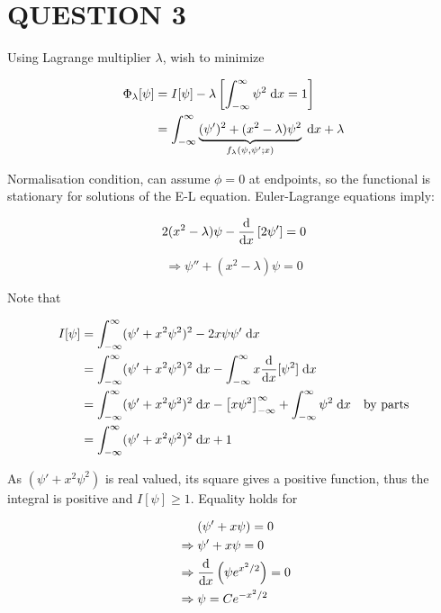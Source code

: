 \documentclass[a4paper]{article}
\begin{document}
\section{QUESTION 3}

Using Lagrange multiplier $ \lambda $, wish to minimize


\begin{align*}
\Phi_{\lambda}[\psi] & = I[\psi] - \lambda  \left[    \int_{-\infty}^{\infty}  \psi^{2} \; \mathrm{d} x = 1  \right] \\
& = \int_{-\infty}^{\infty} \underbrace{(\psi')^{2} + (x^{2} - \lambda  ) \psi^{2} }_{f_{\lambda}(\psi,\psi' ; x)} \; \mathrm{d} x + \lambda
\end{align*}

Normalisation condition, can assume $ \phi = 0 $ at endpoints, so the functional is stationary for solutions of the E-L equation.
Euler-Lagrange equations imply:

\[ 2(x^{2} - \lambda) \psi - \frac{\mathrm{d} }{\mathrm{d} x} \left[  2 \psi' \right] = 0  \]

\[ \Rightarrow \psi'' + (x^{2} - \lambda) \psi = 0 \]

Note that

\begin{align*}
I[\psi]  & =  \int_{-\infty}^{\infty}  (\psi' + x^{2} \psi^{2} )^{2} - 2 x \psi \psi' \; \mathrm{d} x    \\
& =  \int_{-\infty}^{\infty}  (\psi' + x^{2} \psi^{2} )^{2} \; \mathrm{d} x  - \int_{-\infty}^{\infty}  x \frac{\mathrm{d} }{\mathrm{d} x}[\psi^{2}] \; \mathrm{d} x \\
& =  \int_{-\infty}^{\infty}  (\psi' + x^{2} \psi^{2} )^{2} \; \mathrm{d} x  - \left[     x \psi^{2} \right]_{-\infty}^{\infty} + \int_{-\infty}^{\infty} \psi^{2} \; \mathrm{d} x  \quad \text{by parts} \\
& =   \int_{-\infty}^{\infty}  (\psi' + x^{2} \psi^{2} )^{2} \; \mathrm{d} x + 1   \end{align*}

As $ (\psi' + x^{2} \psi^{2}) $ is real valued, its square gives a positive function, thus the integral is positive and $ I[\psi] \geq 1 $. Equality holds for 

\begin{align*}
& \quad \; \; (\psi' + x \psi) = 0 \\
& \Rightarrow \psi'+ x \psi = 0 \\
& \Rightarrow \frac{\mathrm{d} }{\mathrm{d} x}  \left( \psi e^{x^{2}/2} \right) = 0 \\
& \Rightarrow \psi = C e^{- x^{2} / 2 }  
\end{align*}
\end{document}
